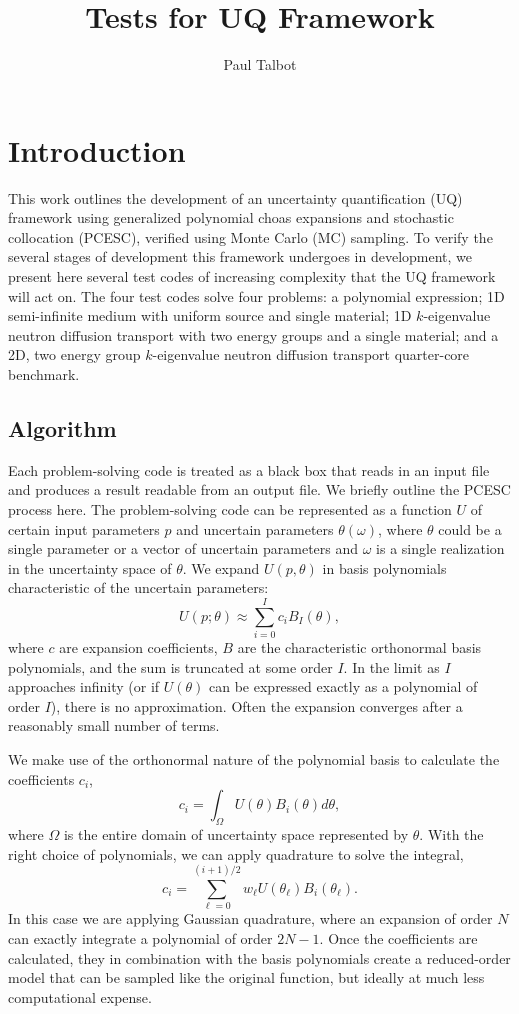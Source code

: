 \documentclass[11pt]{article} %
\title{Tests for UQ Framework}
\author{Paul Talbot}
\begin{document}
\maketitle
\section{Introduction}
This work outlines the development of an uncertainty quantification (UQ) framework using generalized polynomial choas expansions and stochastic collocation (PCESC), verified using Monte Carlo (MC) sampling.  To verify the several stages of development this framework undergoes in development, we present here several test codes of increasing complexity that the UQ framework will act on.  The four test codes solve four problems: a polynomial expression; 1D semi-infinite medium with uniform source and single material; 1D $k$-eigenvalue neutron diffusion transport with two energy groups and a single material; and a 2D, two energy group $k$-eigenvalue neutron diffusion transport quarter-core benchmark.

\subsection{Algorithm}
Each problem-solving code is treated as a black box that reads in an input file and produces a result readable from an output file.  We briefly outline the PCESC process here.  The problem-solving code can be represented as a function $U$ of certain input parameters $p$ and uncertain parameters $\theta(\omega)$, where $\theta$ could be a single parameter or a vector of uncertain parameters and $\omega$ is a single realization in the uncertainty space of $\theta$.  We expand $U(p,\theta)$ in basis polynomials characteristic of the uncertain parameters:
\begin{equation}
U(p;\theta) \approx \sum_{i=0}^I c_i B_I(\theta),
\end{equation}
where $c$ are expansion coefficients, $B$ are the characteristic orthonormal basis polynomials, and the sum is truncated at some order $I$.  In the limit as $I$ approaches infinity (or if $U(\theta)$ can be expressed exactly as a polynomial of order $I$), there is no approximation.  Often the expansion converges after a reasonably small number of terms.

We make use of the orthonormal nature of the polynomial basis to calculate the coefficients $c_i$,
\begin{equation}
c_i = \int_\Omega U(\theta)B_i(\theta)d\theta,
\end{equation}
where $\Omega$ is the entire domain of uncertainty space represented by $\theta$.  With the right choice of polynomials, we can apply quadrature to solve the integral,
\begin{equation}
c_i = \sum_{\ell=0}^{(i+1)/2} w_\ell U(\theta_\ell) B_i(\theta_\ell).
\end{equation}
In this case we are applying Gaussian quadrature, where an expansion of order $N$ can exactly integrate a polynomial of order $2N-1$.  Once the coefficients are calculated, they in combination with the basis polynomials create a reduced-order model that can be sampled like the original function, but ideally at much less computational expense.
\end{document}
